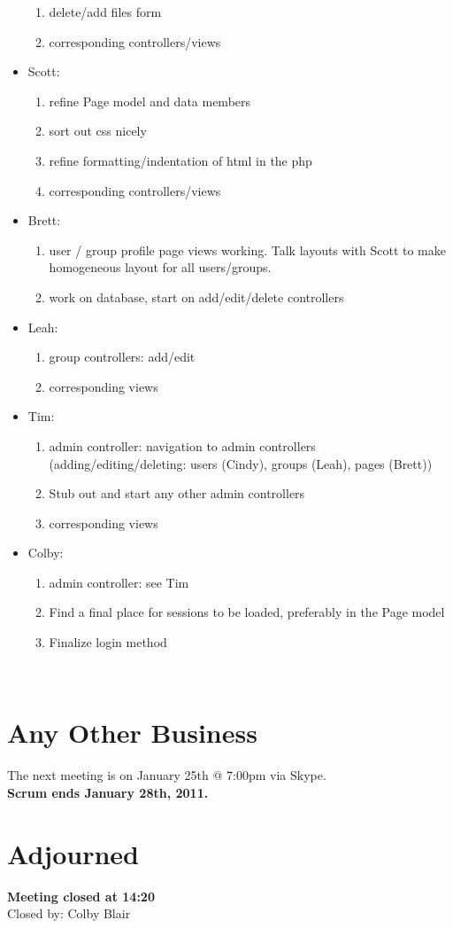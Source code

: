\documentclass[12pt]{article}
\begin{document}
\begin{itemize}
\begin{enumerate}
   \item delete/add files form
   \item corresponding controllers/views
\end{enumerate}
\item Scott:
\begin{enumerate}
   \item refine Page model and data members
   \item sort out css nicely
   \item refine formatting/indentation of html in the php
   \item corresponding controllers/views
\end{enumerate}
\item Brett:
\begin{enumerate}
   \item user / group profile page views working. Talk layouts with Scott to make homogeneous layout for all users/groups.
   \item work on database, start on add/edit/delete controllers
\end{enumerate}
\item Leah:
\begin{enumerate}
 \item group controllers: add/edit
 \item corresponding views
\end{enumerate}
\item Tim:
\begin{enumerate}
 \item admin controller: navigation to admin controllers (adding/editing/deleting: users (Cindy), groups (Leah), pages (Brett))
 \item Stub out and start any other admin controllers
 \item corresponding views
\end{enumerate}
\item Colby:
\begin{enumerate}
 \item admin controller: see Tim
 \item Find a final place for sessions to be loaded, preferably in the Page model
 \item Finalize login method
\end{enumerate}
\end{itemize}
\\  
\section{Any Other Business}
The next meeting is on January 25th @ 7:00pm via Skype. \\
\textbf{Scrum ends January 28th, 2011.}
\\
\section{Adjourned}
\textbf{Meeting closed at 14:20} \\
Closed by: Colby Blair \\
\end{document}
